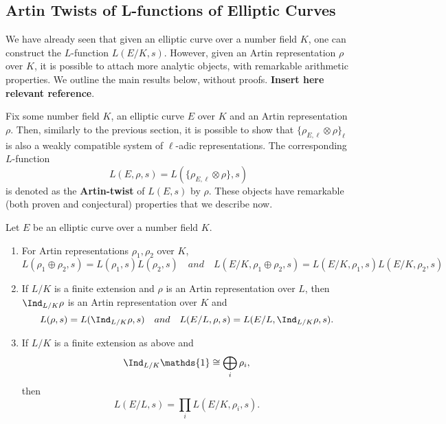 \subsection{Artin Twists of L-functions of Elliptic Curves}

We have already seen that given an elliptic curve over a number field $K$, one can construct the $L$-function $L(E/K,s)$. However, given an Artin representation $\rho$ over $K$, it is possible to attach more analytic objects, with remarkable arithmetic properties. We outline the main results below, without proofs. \textbf{Insert here relevant reference}. 

Fix some number field $K$, an elliptic curve $E$ over $K$ and an Artin representation $\rho$. Then, similarly to the previous section, it is possible to show that $\{\rho_{E,\ell}\otimes\rho\}_\ell$ is also a weakly compatible system of $\ell$-adic representations. The corresponding $L$-function
$$L(E,\rho,s)=L(\{\rho_{E,\ell}\otimes\rho\},s)$$
is denoted as the \textbf{Artin-twist} of $L(E,s)$ by $\rho$. These objects have remarkable (both proven and conjectural) properties that we describe now.

\begin{thm}
    Let $E$ be an elliptic curve over a number field $K$.
    \begin{enumerate}
        \item For Artin representations $\rho_1,\rho_2$ over $K$,
        $$L(\rho_1\oplus\rho_2,s)=L(\rho_1,s)L(\rho_2,s)\quad and\quad L(E/K,\rho_1\oplus\rho_2,s)=L(E/K,\rho_1,s)L(E/K,\rho_2,s)$$
        \item If $L/K$ is a finite extension and $\rho$ is an Artin representation over $L$, then $\Ind_{L/K}\rho$ is an Artin representation over $K$ and 
        $$L(\rho,s)=L(\Ind_{L/K}\rho,s)\quad and\quad L(E/L,\rho,s)=L(E/L,\Ind_{L/K}\rho,s).$$
        \item If $L/K$ is a finite extension as above and 
        $$\Ind_{L/K}\mathds{1}\cong\bigoplus_i\rho_i,$$
        then
        $$L(E/L,s)=\prod_i L(E/K,\rho_i,s).$$
    \end{enumerate}
\end{thm}



